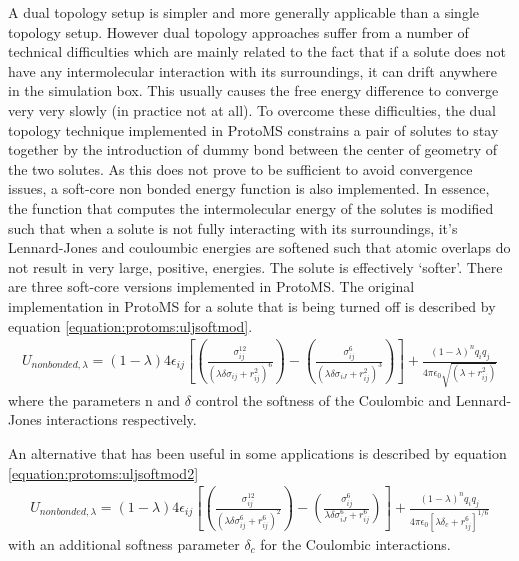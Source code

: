 \documentclass[letterpaper,10pt,english]{sphinxmanual}
\begin{document}
A dual topology setup is simpler and more generally applicable than a single topology setup. However dual topology approaches suffer from a number of technical difficulties which are mainly related to the fact that if a solute does not have any intermolecular interaction with its surroundings, it can drift anywhere in the simulation box. This usually causes the free energy difference to converge very very slowly (in practice not at all). To overcome these difficulties, the dual topology technique implemented in ProtoMS constrains a pair of solutes to stay together by the introduction of dummy bond between the center of geometry of the two solutes. As this does not prove to be sufficient to avoid convergence issues, a soft-core non bonded energy function is also implemented. In essence, the function that computes the intermolecular energy of the solutes is modified such that when a solute is not fully interacting with its surroundings, it’s Lennard-Jones and couloumbic energies are softened such that atomic overlaps do not result in very large, positive, energies. The solute is effectively ‘softer’. There are three soft-core versions implemented in ProtoMS. The original implementation in ProtoMS for a solute
that is being turned off is described by equation \eqref{equation:protoms:uljsoftmod}.
\begin{equation}\label{equation:protoms:uljsoftmod}
\begin{split}U_{non bonded,\lambda}= (1-\lambda) 4{\epsilon}_{ij} \left[ \left( \frac{ \sigma_{ij}^{12} }{ ( \lambda \delta \sigma_{ij} + r_{ij}^{2} )^{6}} \right) - \left( \frac{ \sigma_{ij}^{6} }{ (\lambda \delta \sigma_{iJ}  + r_{ij}^{2})^{3} } \right) \right] +  \frac{(1-\lambda)^{n} q_{i}q_{j}} {4\pi{\epsilon}_{0}\sqrt{(\lambda +  r_{ij}^{2})}}\end{split}
\end{equation}
where the parameters n and \(\delta\) control the softness of the Coulombic and Lennard-Jones interactions respectively.

An alternative that has been useful in some applications is described by equation \eqref{equation:protoms:uljsoftmod2}
\begin{equation}\label{equation:protoms:uljsoftmod2}
\begin{split}U_{non bonded,\lambda}= (1-\lambda) 4{\epsilon}_{ij} \left[  \left( \frac{ \sigma_{ij}^{12} }{ ( \lambda \delta \sigma_{ij}^6 + r_{ij}^{6} )^{2}} \right) -  \left( \frac{ \sigma_{ij}^{6} }{ \lambda \delta \sigma_{iJ}^6  + r_{ij}^{6} } \right) \right] +  \frac{(1-\lambda)^{n} q_{i}q_{j}} {4\pi{\epsilon}_{0} \left [ \lambda \delta_c +  r_{ij}^{6} \right ]^{1/6}}\end{split}
\end{equation}
with an additional softness parameter \(\delta_c\) for the Coulombic interactions.
\end{document}
